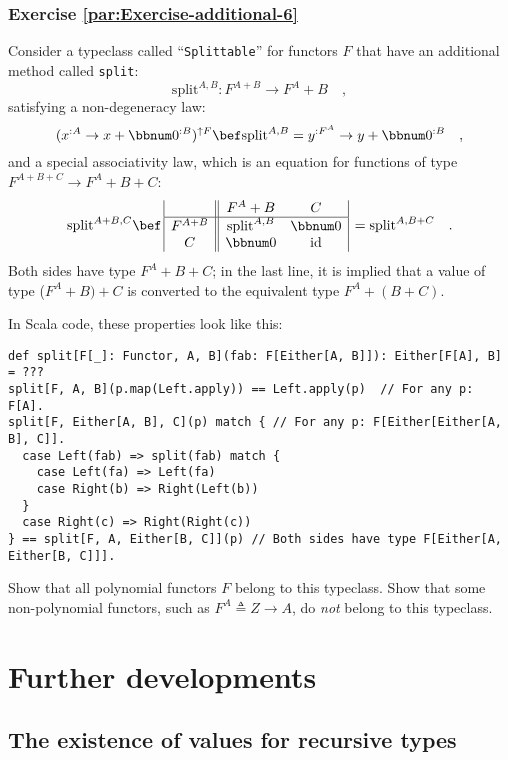 \subsubsection{Exercise \label{par:Exercise-additional-6}\ref{par:Exercise-additional-6}}

Consider a typeclass called \textsf{``}\lstinline!Splittable!\textsf{''} for functors
$F$ that have an additional method called \lstinline!split!:
\[
\text{split}^{A,B}:F^{A+B}\rightarrow F^{A}+B\quad,
\]
satisfying a non-degeneracy
law:
\[
(x^{:A}\rightarrow x+\bbnum 0^{:B})^{\uparrow F}\bef\text{split}^{A,B}=y^{:F^{A}}\rightarrow y+\bbnum 0^{:B}\quad,
\]
and a special associativity law,
which is an equation for functions of type $F^{A+B+C}\rightarrow F^{A}+B+C$:
\[
\text{split}^{A+B,C}\bef\,\begin{array}{|c||cc|}
 & F^{A}+B & C\\
\hline F^{A+B} & \text{split}^{A,B} & \bbnum 0\\
C & \bbnum 0 & \text{id}
\end{array}\,=\text{split}^{A,B+C}\quad.
\]
Both sides have type $F^{A}+B+C$; in the last line, it is implied
that a value of type ($F^{A}+B)+C$ is converted to the equivalent
type $F^{A}+(B+C)$.

In Scala code, these properties look like this:
\begin{lstlisting}
def split[F[_]: Functor, A, B](fab: F[Either[A, B]]): Either[F[A], B] = ???
split[F, A, B](p.map(Left.apply)) == Left.apply(p)  // For any p: F[A].
split[F, Either[A, B], C](p) match { // For any p: F[Either[Either[A, B], C]].
  case Left(fab) => split(fab) match {
    case Left(fa) => Left(fa)
    case Right(b) => Right(Left(b))
  }
  case Right(c) => Right(Right(c))
} == split[F, A, Either[B, C]](p) // Both sides have type F[Either[A, Either[B, C]]].
\end{lstlisting}
Show that all polynomial functors $F$ belong to this typeclass. Show
that some non-polynomial functors, such as $F^{A}\triangleq Z\rightarrow A$,
do \emph{not} belong to this typeclass.

\section{Further developments}

\subsection{The existence of values for recursive types\label{subsec:Recursive-types-and-the-existence-of-their-values}}

